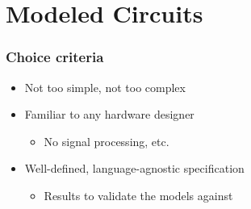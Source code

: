 \section{Modeled Circuits}
\label{sec:modeled-circuits}
    \frame{\sectionpage}

    \begin{frame}
        \frametitle{Choice criteria}

        \begin{itemize}
            \item Not too simple, not too complex
            \item Familiar to any hardware designer
                \begin{itemize}
                    \item No signal processing, etc.
                \end{itemize}
            \item Well-defined, language-agnostic specification
                \begin{itemize}
                    \item Results to validate the models against
                \end{itemize}
        \end{itemize}

    \end{frame}

